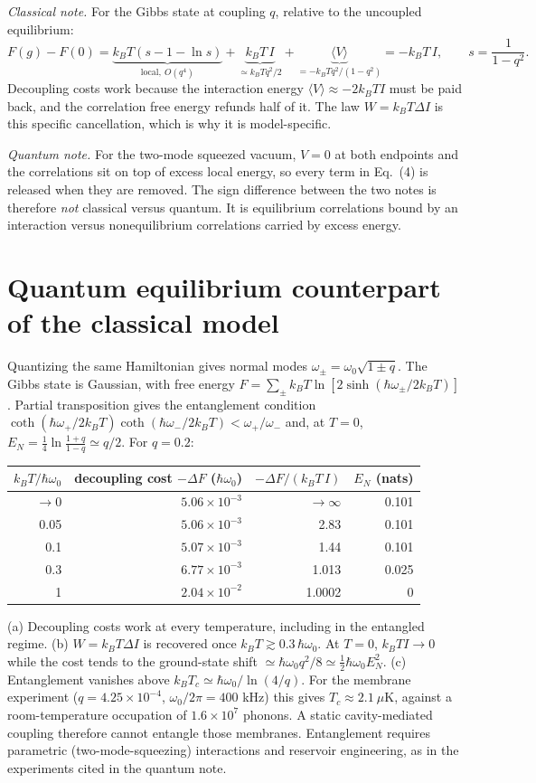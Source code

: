 \documentclass[9pt]{article}
\begin{document}
\emph{Classical note.} For the Gibbs state at coupling $q$, relative to the uncoupled equilibrium:
\begin{equation}
 F(g)-F(0)=\underbrace{k_BT(s-1-\ln s)}_{\text{local},\ O(q^4)}+\underbrace{k_BT\,I}_{\simeq k_BTq^2/2}+\underbrace{\langle V\rangle}_{=-k_BTq^2/(1-q^2)}=-k_BT\,I,\qquad s=\frac{1}{1-q^2}.
\end{equation}
Decoupling costs work because the interaction energy $\langle V\rangle\approx-2k_BTI$ must be paid back, and the correlation free energy refunds half of it. The law $W=k_BT\Delta I$ is this specific cancellation, which is why it is model-specific.

\emph{Quantum note.} For the two-mode squeezed vacuum, $V=0$ at both endpoints and the correlations sit on top of excess local energy, so every term in Eq.~(4) is released when they are removed. The sign difference between the two notes is therefore \emph{not} classical versus quantum. It is equilibrium correlations bound by an interaction versus nonequilibrium correlations carried by excess energy.

\section{Quantum equilibrium counterpart of the classical model}
Quantizing the same Hamiltonian gives normal modes $\omega_\pm=\omega_0\sqrt{1\pm q}$. The Gibbs state is Gaussian, with free energy $F=\sum_\pm k_BT\ln[2\sinh(\hbar\omega_\pm/2k_BT)]$. Partial transposition gives the entanglement condition $\coth(\hbar\omega_+/2k_BT)\coth(\hbar\omega_-/2k_BT)<\omega_+/\omega_-$ and, at $T=0$, $E_N=\tfrac14\ln\frac{1+q}{1-q}\simeq q/2$.\cite{audenaert2002} For $q=0.2$:
\begin{center}
\begin{tabular}{rrrr}
\toprule
$k_BT/\hbar\omega_0$ & decoupling cost $-\Delta F$ ($\hbar\omega_0$) & $-\Delta F/(k_BT\,I)$ & $E_N$ (nats)\\
\midrule
$\to0$ & $5.06\times10^{-3}$ & $\to\infty$ & 0.101\\
0.05 & $5.06\times10^{-3}$ & 2.83 & 0.101\\
0.1  & $5.07\times10^{-3}$ & 1.44 & 0.101\\
0.3  & $6.77\times10^{-3}$ & 1.013 & 0.025\\
1    & $2.04\times10^{-2}$ & 1.0002 & 0\\
\bottomrule
\end{tabular}
\end{center}
(a) Decoupling costs work at every temperature, including in the entangled regime. (b) $W=k_BT\Delta I$ is recovered once $k_BT\gtrsim0.3\,\hbar\omega_0$. At $T=0$, $k_BTI\to0$ while the cost tends to the ground-state shift $\simeq\hbar\omega_0q^2/8\simeq\tfrac12\hbar\omega_0E_N^2$. (c) Entanglement vanishes above $k_BT_c\simeq\hbar\omega_0/\ln(4/q)$. For the membrane experiment ($q=4.25\times10^{-4}$, $\omega_0/2\pi=400$ kHz) this gives $T_c\approx2.1\ \mu$K, against a room-temperature occupation of $1.6\times10^7$ phonons. A static cavity-mediated coupling therefore cannot entangle those membranes. Entanglement requires parametric (two-mode-squeezing) interactions and reservoir engineering, as in the experiments cited in the quantum note.
\end{document}
